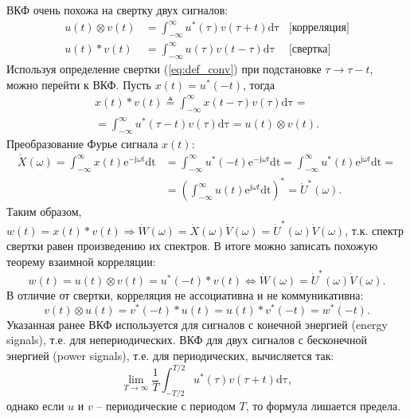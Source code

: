 \documentclass[12pt,a4paper]{article}
\begin{document}
ВКФ очень похожа на свертку двух сигналов:
\begin{align}
\nonumber
  u\left(t\right)\otimes v\left(t\right) &= \int_{-\infty}^{\infty}{u^*\left(\tau\right)v\left(\tau +t\right)\mathrm{d\tau}} & \text{[корреляция]} \\
  u\left(t\right)\ast v\left(t\right) &= \int_{-\infty}^{\infty}{u\left(\tau\right)v\left(t-\tau\right)\mathrm{d\tau}} & \text{[свертка]} \label{eq:def_conv}
\end{align}
Используя определение свертки (\ref{eq:def_conv}) при подстановке $\tau\rightarrow\tau-t$, можно перейти к ВКФ. Пусть $x\left(t\right)=u^*\left(-t\right)$, тогда
\begin{align*}
\nonumber
  x\left(t\right)\ast v\left(t\right)\triangleq \int_{-\infty}^{\infty}{x\left(t-\tau\right)v\left(\tau\right)\mathrm{d\tau}} = \\
  = \int_{-\infty}^{\infty}{u^*\left(\tau-t\right)v\left(\tau\right)\mathrm{d\tau}} = u\left(t\right)\otimes v\left(t\right).
\end{align*}
Преобразование Фурье сигнала $x\left(t\right)$:
\begin{align*}
  \dot{X}\left(\omega\right)=\int_{-\infty}^{\infty}{x\left(t\right)\mathrm{e}^{-\mathrm{j}\omega t}\mathrm{dt}}&=\int_{-\infty}^{\infty}{u^*\left(-t\right)\mathrm{e}^{-\mathrm{j}\omega t}\mathrm{dt}}=\int_{-\infty}^{\infty}{u^*\left(t\right)\mathrm{e}^{\mathrm{j}\omega t}\mathrm{dt}} = \\
  &=\left(\int_{-\infty}^{\infty}{u\left(t\right)\mathrm{e}^{\mathrm{j}\omega t}\mathrm{dt}}\right)^*=\dot{U}^*\left(\omega\right).
\end{align*}
Таким образом, $w(t)=x(t)\ast v(t)\Rightarrow \dot{W}(\omega)=\dot{X}(\omega)\dot{V}(\omega)=\dot{U}^*(\omega)\dot{V}(\omega)$, т.к. спектр свертки равен произведению их спектров. В итоге можно записать похожую теорему взаимной корреляции:
\begin{equation}
w(t)=u(t)\otimes v(t)=u^*(-t)\ast v(t)\Leftrightarrow \dot{W}(\omega)=\dot{U}^*(\omega)\dot{V}(\omega). \label{eq:def_cross_corr}
\end{equation}
В отличие от свертки, корреляция не ассоциативна и не коммуникативна:
\begin{equation}
\nonumber
  v(t)\otimes u(t)=v^*(-t)\ast u(t)=u(t)\ast v^*(-t)=w^*(-t).
\end{equation}
Указанная ранее ВКФ используется для сигналов с конечной энергией (energy signals), т.е. для непериодических. ВКФ для двух сигналов с бесконечной энергией (power signals), т.е. для периодических, вычисляется так:
\begin{equation}
\nonumber
  \lim_{T\rightarrow\infty}\frac{1}{T}\int_{-T/2}^{T/2}{u^*(\tau)v(\tau+t)\mathrm{d\tau}},
\end{equation}
однако если $u$ и $v$ -- периодические с периодом $T$, то формула лишается предела.
\end{document}
